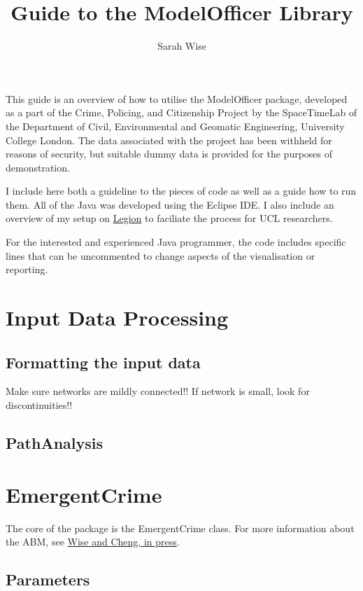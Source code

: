 \documentclass[11pt]{article} %
\title{Guide to the ModelOfficer Library}
\author{Sarah Wise}
\date{}
\begin{document}
\maketitle

This guide is an overview of how to utilise the ModelOfficer package, developed as a part of the Crime, Policing, and Citizenship Project by the SpaceTimeLab of the Department of Civil, Environmental and Geomatic Engineering, University College London. The data associated with the project has been withheld for reasons of security, but suitable dummy data is provided for the purposes of demonstration.

I include here both a guideline to the pieces of code as well as a guide how to run them. All of the Java was developed using the Eclipse IDE. I also include an overview of my setup on \href{https://wiki.rc.ucl.ac.uk/wiki/Category:Legion_User_Guide}{Legion} to faciliate the process for UCL researchers.

For the interested and experienced Java programmer, the code includes specific lines that can be uncommented to change aspects of the visualisation or reporting.



\section{Input Data Processing}

\subsection{Formatting the input data}
Make sure networks are mildly connected!! If network is small, look for discontinuities!!


\subsection{PathAnalysis}


\section{EmergentCrime}

The core of the package is the EmergentCrime class. For more information about the ABM, see \href{http://onlinelibrary.wiley.com/journal/10.1111/(ISSN)1467-9671}{Wise and Cheng, in press}.

\subsection{Parameters}
\end{document}
